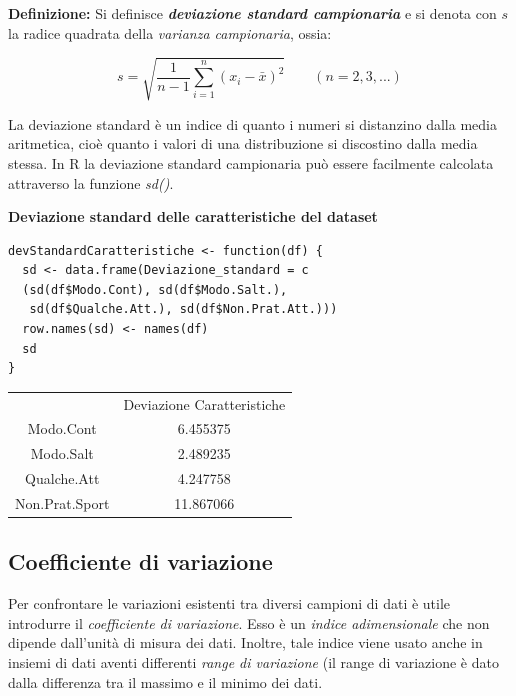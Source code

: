 \noindent \textbf{Definizione:} Si definisce \textbf{\textit{deviazione standard campionaria}} e si denota con $s$ la radice quadrata della \textit{varianza campionaria}, ossia:

\[s = \sqrt{\frac{1}{n-1} \sum_{i=1}^n (x_i - \bar x)^2} \quad \quad (n = 2, 3, ...)\]

La deviazione standard è un indice di quanto i numeri si distanzino dalla media aritmetica, cioè quanto i valori di una distribuzione si discostino dalla media stessa. In R la deviazione standard campionaria può essere facilmente calcolata attraverso la funzione \textit{sd()}.

\vspace{5mm}
\noindent \textbf{Deviazione standard delle caratteristiche del dataset}

\vspace{5mm}
\begin{lstlisting}
devStandardCaratteristiche <- function(df) {
  sd <- data.frame(Deviazione_standard = c
  (sd(df$Modo.Cont), sd(df$Modo.Salt.),
   sd(df$Qualche.Att.), sd(df$Non.Prat.Att.)))
  row.names(sd) <- names(df)
  sd
}
\end{lstlisting}
\vspace{5mm}

\vspace{5mm}
\begin{tabular}{ c c}
  & Deviazione Caratteristiche\\
 Modo.Cont & 6.455375\\ 
 Modo.Salt & 2.489235\\
 Qualche.Att & 4.247758\\ 
 Non.Prat.Sport & 11.867066\\ 
\end{tabular}
\vspace{5mm}

\subsection{Coefficiente di variazione}\label{cap3.2.3}

Per confrontare le variazioni esistenti tra diversi campioni di dati è utile introdurre il \textit{coefficiente di variazione}. Esso è un \textit{indice adimensionale} che non dipende dall'unità di misura dei dati. Inoltre, tale indice viene usato anche in insiemi di dati aventi differenti \textit{range di variazione} (il range di variazione è dato dalla differenza tra il massimo e il minimo dei dati.

